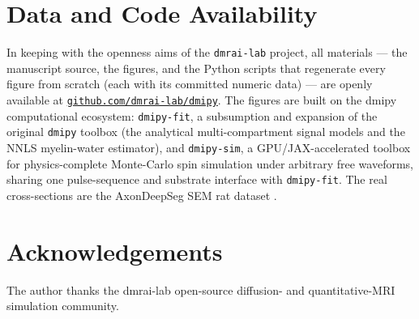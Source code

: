 \documentclass[12pt]{article}
\begin{document}
\appendix


\section*{Data and Code Availability}
In keeping with the openness aims of the \texttt{dmrai-lab} project, all materials --- the
manuscript source, the figures, and the Python scripts that regenerate every figure from
scratch (each with its committed numeric data) --- are openly available at
\href{https://github.com/dmrai-lab/dmipy}{\texttt{github.com/dmrai-lab/dmipy}}. The figures
are built on the dmipy computational ecosystem: \texttt{dmipy-fit}, a subsumption and
expansion of the original \texttt{dmipy} toolbox \citep{Fick2019} (the analytical
multi-compartment signal models and the NNLS myelin-water estimator), and
\texttt{dmipy-sim}, a GPU/JAX-accelerated toolbox for physics-complete Monte-Carlo spin
simulation under arbitrary free waveforms, sharing one pulse-sequence and substrate
interface with \texttt{dmipy-fit}. The real cross-sections are the AxonDeepSeg SEM
rat dataset \citep{Zaimi2018}.

\section*{Acknowledgements}
The author thanks the dmrai-lab open-source diffusion- and quantitative-MRI
simulation community.


\end{document}

